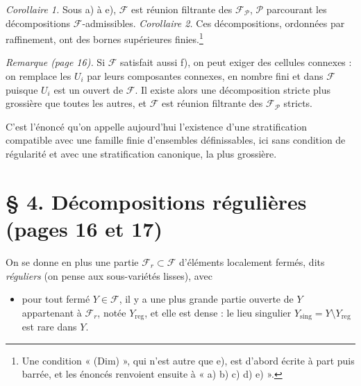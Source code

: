 \documentclass[11pt,a4paper]{article}
\begin{document}
\emph{Corollaire 1.} Sous a) à e), $\mathcal{F}$ est réunion filtrante des
$\mathcal{F}_{\mathcal{P}}$, $\mathcal{P}$ parcourant les décompositions
$\mathcal{F}$-admissibles. \emph{Corollaire 2.} Ces décompositions, ordonnées
par raffinement, ont des bornes supérieures finies.\footnote{Une condition
« (Dim) », qui n'est autre que e), est d'abord écrite à part puis barrée, et
les énoncés renvoient ensuite à « a) b) c) d) e) ».}

\emph{Remarque (page 16).} Si $\mathcal{F}$ satisfait aussi f), on peut exiger
des cellules connexes : on remplace les $U_i$ par leurs composantes connexes, en
nombre fini et dans $\mathcal{F}$ puisque $U_i$ est un ouvert de $\mathcal{F}$.
Il existe alors une décomposition stricte plus grossière que toutes les autres,
et $\mathcal{F}$ est réunion filtrante des $\mathcal{F}_{\mathcal{P}}$
stricts.

C'est l'énoncé qu'on appelle aujourd'hui l'existence d'une stratification
compatible avec une famille finie d'ensembles définissables, ici sans
condition de régularité et avec une stratification canonique, la plus
grossière.

\section*{§ 4. Décompositions régulières (pages 16 et 17)}

On se donne en plus une partie $\mathcal{F}_r \subset \mathcal{F}$ d'éléments
localement fermés, dits \emph{réguliers} (on pense aux sous-variétés lisses),
avec

\begin{itemize}
\item[(S)] pour tout fermé $Y \in \mathcal{F}$, il y a une plus grande partie
  ouverte de $Y$ appartenant à $\mathcal{F}_r$, notée $Y_{\mathrm{reg}}$, et
  elle est dense : le lieu singulier $Y_{\mathrm{sing}} = Y \setminus
  Y_{\mathrm{reg}}$ est rare dans $Y$.
\end{itemize}
\end{document}
